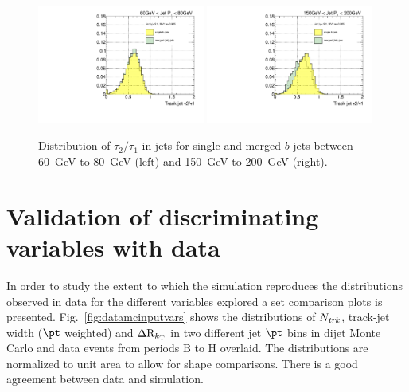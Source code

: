\begin{figure}[tp]
\centering
\includegraphics[width=0.49\textwidth]{FIGS/VarsSingleMerged/TauRatio060.pdf}
\includegraphics[width=0.49\textwidth]{FIGS/VarsSingleMerged/TauRatio150.pdf}
\caption{Distribution of $\tau_2/\tau_1$ in jets for single and merged $b$-jets between 60~GeV to 80~GeV (left) and 150~GeV to 200~GeV (right).}
\label{fig:tauratiosinglemerged}
\end{figure}





\section{Validation of discriminating variables with data}\label{sec:validation}
 
 In order to study the extent to which the simulation reproduces the distributions observed in data for the different variables explored a set comparison plots is presented. Fig.~\ref{fig:datamcinputvars} shows the distributions of $N_{\it trk}$, track-jet width ($\pt$ weighted) and $\Delta {\rm R}_{k_{\rm T}}$ in two different jet $\pt$ bins in dijet Monte Carlo and data events from periods B to H overlaid. The distributions are normalized to unit area to allow for shape comparisons. There is a good agreement between data and simulation. 

